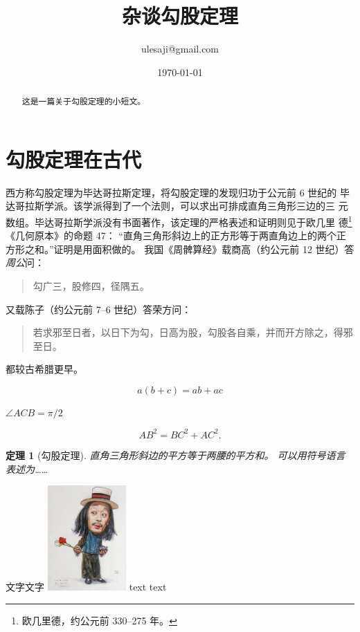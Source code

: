 \documentclass[UTF8]{ctexart}
\title{杂谈勾股定理}
\author{ulesaji@gmail.com}
\date{\today}
\newtheorem{thm}{定理}
\begin{document}
\maketitle
\begin{abstract}
    这是一篇关于勾股定理的小短文。
\end{abstract}
\tableofcontents

\section{勾股定理在古代}
西方称勾股定理为毕达哥拉斯定理，将勾股定理的发现归功于公元前 6 世纪的
毕达哥拉斯学派。该学派得到了一个法则，可以求出可排成直角三角形三边的三
元数组。毕达哥拉斯学派没有书面著作，该定理的严格表述和证明则见于欧几里
德\footnote{欧几里德，约公元前 330--275 年。}《几何原本》的命题 47：
“直角三角形斜边上的正方形等于两直角边上的两个正方形之和。”证明是用面积做的。
我国《周髀算经》载商高（约公元前 12 世纪）答\emph{周公}问：
\begin{quote}
    \kaishu
    勾广三，股修四，径隅五。
\end{quote}
又载陈子（约公元前 7--6 世纪）答荣方问：
\begin{quote}
    \kaishu
    若求邪至日者，以日下为勾，日高为股，勾股各自乘，并而开方除之，得邪至日。
\end{quote}
都较古希腊更早。

\begin{equation}
    a(b+c) = ab + ac
\end{equation}

$\angle ACB = \pi / 2$

\begin{equation}
    AB^2 = BC^2 + AC^2.
\end{equation}

\begin{thm}[勾股定理]
    直角三角形斜边的平方等于两腰的平方和。
    可以用符号语言表述为……
\end{thm}


文字文字
\includegraphics[width=3cm]{ma_bang_de.jpg}
text text
\end{document}
